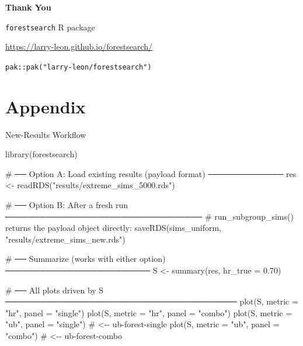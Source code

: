 \documentclass[
  11pt,
  ignorenonframetext,
  aspectratio=169,
]{beamer}
\newenvironment{Shaded}{\begin{snugshade}}{\end{snugshade}}
\newcommand{\AttributeTok}[1]{\textcolor[rgb]{0.40,0.45,0.13}{#1}}
\newcommand{\CommentTok}[1]{\textcolor[rgb]{0.37,0.37,0.37}{#1}}
\newcommand{\FloatTok}[1]{\textcolor[rgb]{0.68,0.00,0.00}{#1}}
\newcommand{\FunctionTok}[1]{\textcolor[rgb]{0.28,0.35,0.67}{#1}}
\newcommand{\NormalTok}[1]{\textcolor[rgb]{0.00,0.23,0.31}{#1}}
\newcommand{\OtherTok}[1]{\textcolor[rgb]{0.00,0.23,0.31}{#1}}
\newcommand{\StringTok}[1]{\textcolor[rgb]{0.13,0.47,0.30}{#1}}
\begin{document}
\begin{frame}[plain]{}
\protect{}\label{section}
\vfill
\begin{center}
{\Large\bfseries\color{UBCblue} Thank You}

\bigskip

{\large \texttt{forestsearch} R package}

\medskip

\url{https://larry-leon.github.io/forestsearch/}

\medskip

\texttt{pak::pak("larry-leon/forestsearch")}
\end{center}
\vfill
\end{frame}

\section*{Appendix}\label{appendix}

\begin{frame}[fragile]{New-Results Workflow}
\protect{}\label{new-results-workflow}
\footnotesize

\begin{Shaded}
\begin{Highlighting}[]
\FunctionTok{library}\NormalTok{(forestsearch)}

\CommentTok{\# ── Option A: Load existing results (payload format) ─────────────}
\NormalTok{res }\OtherTok{\textless{}{-}} \FunctionTok{readRDS}\NormalTok{(}\StringTok{"results/extreme\_sims\_5000.rds"}\NormalTok{)}

\CommentTok{\# ── Option B: After a fresh run ──────────────────────────────────}
\CommentTok{\# run\_subgroup\_sims() returns the payload object directly:}
\FunctionTok{saveRDS}\NormalTok{(sims\_uniform, }\StringTok{"results/extreme\_sims\_new.rds"}\NormalTok{)}

\CommentTok{\# ── Summarize (works with either option) ─────────────────────────}
\NormalTok{S }\OtherTok{\textless{}{-}} \FunctionTok{summary}\NormalTok{(res, }\AttributeTok{hr\_true =} \FloatTok{0.70}\NormalTok{)}

\CommentTok{\# ── All plots driven by S ────────────────────────────────────────}
\FunctionTok{plot}\NormalTok{(S, }\AttributeTok{metric =} \StringTok{"hr"}\NormalTok{, }\AttributeTok{panel =} \StringTok{"single"}\NormalTok{)}
\FunctionTok{plot}\NormalTok{(S, }\AttributeTok{metric =} \StringTok{"hr"}\NormalTok{, }\AttributeTok{panel =} \StringTok{"combo"}\NormalTok{)}
\FunctionTok{plot}\NormalTok{(S, }\AttributeTok{metric =} \StringTok{"ub"}\NormalTok{, }\AttributeTok{panel =} \StringTok{"single"}\NormalTok{)   }\CommentTok{\# \textless{}{-}{-} ub{-}forest{-}single}
\FunctionTok{plot}\NormalTok{(S, }\AttributeTok{metric =} \StringTok{"ub"}\NormalTok{, }\AttributeTok{panel =} \StringTok{"combo"}\NormalTok{)    }\CommentTok{\# \textless{}{-}{-} ub{-}forest{-}combo}
\end{Highlighting}
\end{Shaded}
\end{frame}
\end{document}
